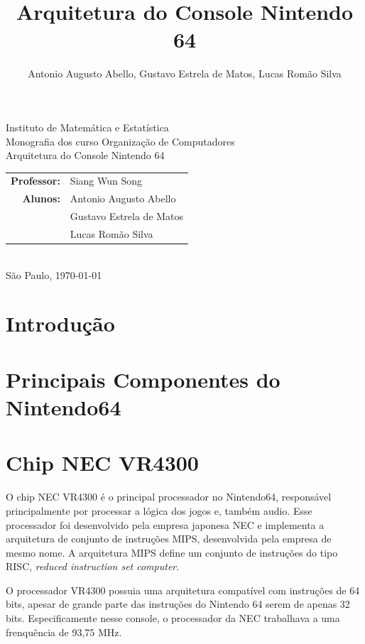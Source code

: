 \documentclass[12pt]{article}
\title{Arquitetura do Console Nintendo 64}
\author{Antonio Augusto Abello, Gustavo Estrela de Matos, Lucas Romão
Silva}
\begin{document}
\doublespacing
\begin{titlepage}
    \vfill
    \begin{center}
        \vspace{0.5\textheight}
        \noindent
        Instituto de Matemática e Estatística \\
        Monografia dos curso Organização de Computadores \\
        \vfill
        \noindent
        {\Large Arquitetura do Console Nintendo 64} \\
        \begin{tabular}{rl}
            {\bf Professor:} & {Siang Wun Song} \\
            {\bf Alunos:}    & {Antonio Augusto Abello} \\
                             & {Gustavo Estrela de Matos} \\
                             & {Lucas Romão Silva} \\
        \end{tabular} \\
        \vspace{\fill}
       \bigskip
        São Paulo, \today \\
       \bigskip
    \end{center}
\end{titlepage}

\pagebreak
\tableofcontents
\pagebreak

\section{Introdução}
\section{Principais Componentes do Nintendo64}
\section{Chip NEC VR4300}
    O chip NEC VR4300 é o principal processador no Nintendo64,
responsável principalmente por processar a lógica dos jogos e, 
também audio. Esse processador foi desenvolvido pela empresa japonesa
NEC e implementa a arquitetura de conjunto de instruções MIPS, 
desenvolvida pela empresa de mesmo nome. A arquitetura MIPS define um
conjunto de instruções do tipo RISC, \emph{reduced instruction set
computer}.

    O processador VR4300 possuia uma arquitetura compatível com 
instruções de 64 bits, apesar de grande parte das instruções do
Nintendo 64 serem de apenas 32 bits. Especificamente nesse console, o
processador da NEC trabalhava a uma frenquência de 93,75 MHz.
\end{document}
